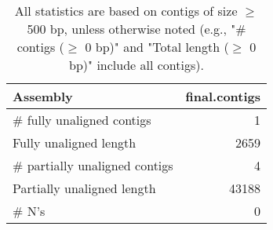 \documentclass[12pt,a4paper]{article}
\begin{document}
\begin{table}[ht]
\begin{center}
\caption{All statistics are based on contigs of size $\geq$ 500 bp, unless otherwise noted (e.g., "\# contigs ($\geq$ 0 bp)" and "Total length ($\geq$ 0 bp)" include all contigs).}
\begin{tabular}{|l*{1}{|r}|}
\hline
Assembly & final.contigs \\ \hline
\# fully unaligned contigs & 1 \\ \hline
Fully unaligned length & 2659 \\ \hline
\# partially unaligned contigs & 4 \\ \hline
Partially unaligned length & 43188 \\ \hline
\# N's & 0 \\ \hline
\end{tabular}
\end{center}
\end{table}
\end{document}
